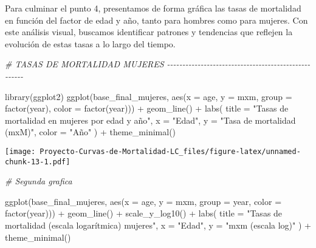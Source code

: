 \documentclass[
]{article}
\newenvironment{Shaded}{\begin{snugshade}}{\end{snugshade}}
\newcommand{\AttributeTok}[1]{\textcolor[rgb]{0.77,0.63,0.00}{#1}}
\newcommand{\CommentTok}[1]{\textcolor[rgb]{0.56,0.35,0.01}{\textit{#1}}}
\newcommand{\FunctionTok}[1]{\textcolor[rgb]{0.00,0.00,0.00}{#1}}
\newcommand{\NormalTok}[1]{#1}
\newcommand{\SpecialCharTok}[1]{\textcolor[rgb]{0.00,0.00,0.00}{#1}}
\newcommand{\StringTok}[1]{\textcolor[rgb]{0.31,0.60,0.02}{#1}}
\begin{document}
Para culminar el punto 4, presentamos de forma gráfica las tasas de
mortalidad en función del factor de edad y año, tanto para hombres como
para mujeres. Con este análisis visual, buscamos identificar patrones y
tendencias que reflejen la evolución de estas tasas a lo largo del
tiempo.

\begin{Shaded}
\begin{Highlighting}[]
\CommentTok{\# TASAS DE MORTALIDAD MUJERES {-}{-}{-}{-}{-}{-}{-}{-}{-}{-}{-}{-}{-}{-}{-}{-}{-}{-}{-}{-}{-}{-}{-}{-}{-}{-}{-}{-}{-}{-}{-}{-}{-}{-}{-}{-}{-}{-}{-}{-}{-}{-}{-}{-}{-}{-}{-}{-}{-}{-}{-}{-}{-}}

\FunctionTok{library}\NormalTok{(ggplot2)}
\FunctionTok{ggplot}\NormalTok{(base\_final\_mujeres, }\FunctionTok{aes}\NormalTok{(}\AttributeTok{x =}\NormalTok{ age, }\AttributeTok{y =}\NormalTok{ mxm, }\AttributeTok{group =} \FunctionTok{factor}\NormalTok{(year), }\AttributeTok{color =} \FunctionTok{factor}\NormalTok{(year))) }\SpecialCharTok{+}
  \FunctionTok{geom\_line}\NormalTok{() }\SpecialCharTok{+}
  \FunctionTok{labs}\NormalTok{(}
    \AttributeTok{title =} \StringTok{"Tasas de mortalidad en mujeres por edad y año"}\NormalTok{,}
    \AttributeTok{x =} \StringTok{"Edad"}\NormalTok{,}
    \AttributeTok{y =} \StringTok{"Tasa de mortalidad (mxM)"}\NormalTok{,}
    \AttributeTok{color =} \StringTok{"Año"}
\NormalTok{  ) }\SpecialCharTok{+}
  \FunctionTok{theme\_minimal}\NormalTok{()}
\end{Highlighting}
\end{Shaded}

\texttt{[image: Proyecto-Curvas-de-Mortalidad-LC\_files/figure-latex/unnamed-chunk-13-1.pdf]}

\begin{Shaded}
\begin{Highlighting}[]
\CommentTok{\# Segunda grafica}

\FunctionTok{ggplot}\NormalTok{(base\_final\_mujeres, }\FunctionTok{aes}\NormalTok{(}\AttributeTok{x =}\NormalTok{ age, }\AttributeTok{y =}\NormalTok{ mxm, }\AttributeTok{group =}\NormalTok{ year, }\AttributeTok{color =} \FunctionTok{factor}\NormalTok{(year))) }\SpecialCharTok{+}
  \FunctionTok{geom\_line}\NormalTok{() }\SpecialCharTok{+}
  \FunctionTok{scale\_y\_log10}\NormalTok{() }\SpecialCharTok{+}
  \FunctionTok{labs}\NormalTok{(}
    \AttributeTok{title =} \StringTok{"Tasas de mortalidad (escala logarítmica) mujeres"}\NormalTok{,}
    \AttributeTok{x =} \StringTok{"Edad"}\NormalTok{,}
    \AttributeTok{y =} \StringTok{"mxm (escala log)"}
\NormalTok{  ) }\SpecialCharTok{+}
  \FunctionTok{theme\_minimal}\NormalTok{()}
\end{Highlighting}
\end{Shaded}
\end{document}
